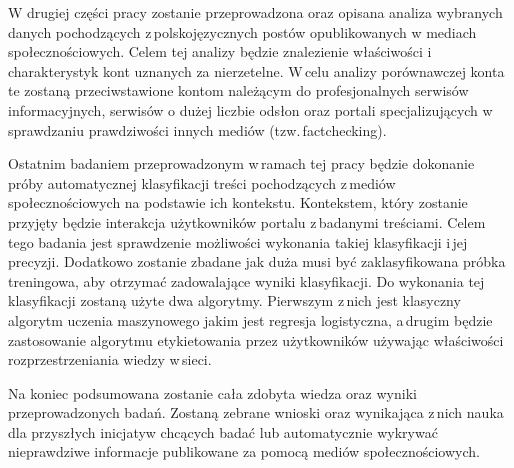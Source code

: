 \par
W drugiej części pracy zostanie przeprowadzona oraz opisana analiza wybranych danych pochodzących z\,polskojęzycznych postów opublikowanych w mediach społecznościowych. Celem tej analizy będzie znalezienie właściwości i\,charakterystyk kont uznanych za nierzetelne. W\,celu analizy porównawczej konta te zostaną przeciwstawione kontom należącym do profesjonalnych serwisów informacyjnych, serwisów o dużej liczbie odsłon oraz portali specjalizujących w sprawdzaniu prawdziwości innych mediów (tzw.\,factchecking).
\par
Ostatnim badaniem przeprowadzonym w\,ramach tej pracy będzie dokonanie próby automatycznej klasyfikacji treści pochodzących z\,mediów społecznościowych na podstawie ich kontekstu. Kontekstem, który zostanie przyjęty będzie interakcja użytkowników portalu z\,badanymi treściami. Celem tego badania jest sprawdzenie możliwości wykonania takiej klasyfikacji i\,jej precyzji. Dodatkowo zostanie zbadane jak duża musi być zaklasyfikowana próbka treningowa, aby otrzymać zadowalające wyniki klasyfikacji. Do wykonania tej klasyfikacji zostaną użyte dwa algorytmy. Pierwszym z\,nich jest klasyczny algorytm uczenia maszynowego jakim jest regresja logistyczna, a\,drugim będzie zastosowanie algorytmu etykietowania przez użytkowników używając właściwości rozprzestrzeniania wiedzy w\,sieci. 
\par
Na koniec podsumowana zostanie cała zdobyta wiedza oraz wyniki przeprowadzonych badań. Zostaną zebrane wnioski oraz wynikająca z\,nich nauka dla przyszłych inicjatyw chcących badać lub automatycznie wykrywać nieprawdziwe informacje publikowane za pomocą mediów społecznościowych. 

